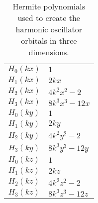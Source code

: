 	\begin{table}[H]
	\begin{centering}
		\begin{tabular}{c|l}
			$H_{0}(kx)$ & $1$  \tabularnewline
			$H_{1}(kx)$ & $2kx$  \tabularnewline
			$H_{2}(kx)$ & $4k^2x^2-2$  \tabularnewline
			$H_{3}(kx)$ & $8k^3x^3-12x$  \tabularnewline
			\hline
			$H_{0}(ky)$ & $1$  \tabularnewline
			$H_{1}(ky)$ & $2ky$  \tabularnewline
			$H_{2}(ky)$ & $4k^2y^2-2$  \tabularnewline
			$H_{3}(ky)$ & $8k^3y^3-12y$  \tabularnewline
			\hline
			$H_{0}(kz)$ & $1$  \tabularnewline
			$H_{1}(kz)$ & $2kz$  \tabularnewline
			$H_{2}(kz)$ & $4k^2z^2-2$  \tabularnewline
			$H_{3}(kz)$ & $8k^3z^3-12z$  \tabularnewline
		\end{tabular}%
	\par\end{centering}
	\protect\caption{Hermite polynomials used to create the harmonic oscillator orbitals in three dimensions.}
	\end{table}

	
